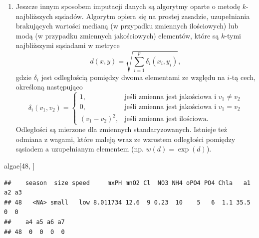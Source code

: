 \documentclass[]{book}
\newenvironment{Shaded}{\begin{snugshade}}{\end{snugshade}}
\newcommand{\DataTypeTok}[1]{\textcolor[rgb]{0.13,0.29,0.53}{#1}}
\newcommand{\DecValTok}[1]{\textcolor[rgb]{0.00,0.00,0.81}{#1}}
\newcommand{\KeywordTok}[1]{\textcolor[rgb]{0.13,0.29,0.53}{\textbf{#1}}}
\newcommand{\NormalTok}[1]{#1}
\newcommand{\OperatorTok}[1]{\textcolor[rgb]{0.81,0.36,0.00}{\textbf{#1}}}
\newcommand{\StringTok}[1]{\textcolor[rgb]{0.31,0.60,0.02}{#1}}
\providecommand{\tightlist}{%
  \setlength{\itemsep}{0pt}\setlength{\parskip}{0pt}}
\theoremstyle{plain}
\theoremstyle{definition}
\theoremstyle{definition}
\theoremstyle{definition}
\theoremstyle{definition}
\theoremstyle{remark}
\begin{document}
\begin{enumerate}
\def\labelenumi{\arabic{enumi}.}
\setcounter{enumi}{3}
\tightlist
\item
  Jeszcze innym sposobem imputacji danych są algorytmy oparte o metodę \(k\)-najbliższych sąsiadów. Algorytm opiera się na prostej zasadzie, uzupełniania brakujących wartości medianą (w przypadku zmiennych ilościowych) lub modą (w przypadku zmiennych jakościowych) elementów, które są \(k\)-tymi najbliższymi sąsiadami w metryce
  \begin{equation}\label{knn}
   d(x,y)=\sqrt{\sum_{i=1}^{p}\delta_i(x_i,y_i)},
  \end{equation}
  gdzie \(\delta_i\) jest odległością pomiędzy dwoma elementami ze względu na \(i\)-tą cech, określoną następująco
  \begin{equation}\label{metryka}
   \delta_i(v_1, v_2)=\begin{cases}
       1,& \text{jeśli zmienna jest jakościowa i }v_1\neq v_2\\
       0,& \text{jeśli zmienna jest jakościowa i }v_1=v_2\\
       (v_1-v_2)^2,& \text{jeśli zmienna jest ilościowa.}
   \end{cases}
  \end{equation}
  Odległości są mierzone dla zmiennych standaryzowanych. Istnieje też odmiana z wagami, które maleją wraz ze wzrostem odległości pomiędzy sąsiadem a uzupełnianym elementem (np. \(w(d)=\exp(d)\)).
\end{enumerate}

\begin{Shaded}
\begin{Highlighting}[]
\NormalTok{algae[}\DecValTok{48}\NormalTok{, ]}
\end{Highlighting}
\end{Shaded}

\begin{verbatim}
##    season  size speed     mxPH mnO2 Cl  NO3 NH4 oPO4 PO4 Chla   a1 a2 a3
## 48   <NA> small   low 8.011734 12.6  9 0.23  10    5   6  1.1 35.5  0  0
##    a4 a5 a6 a7
## 48  0  0  0  0
\end{verbatim}

\begin{Shaded}
\end{Shaded}
\end{document}
